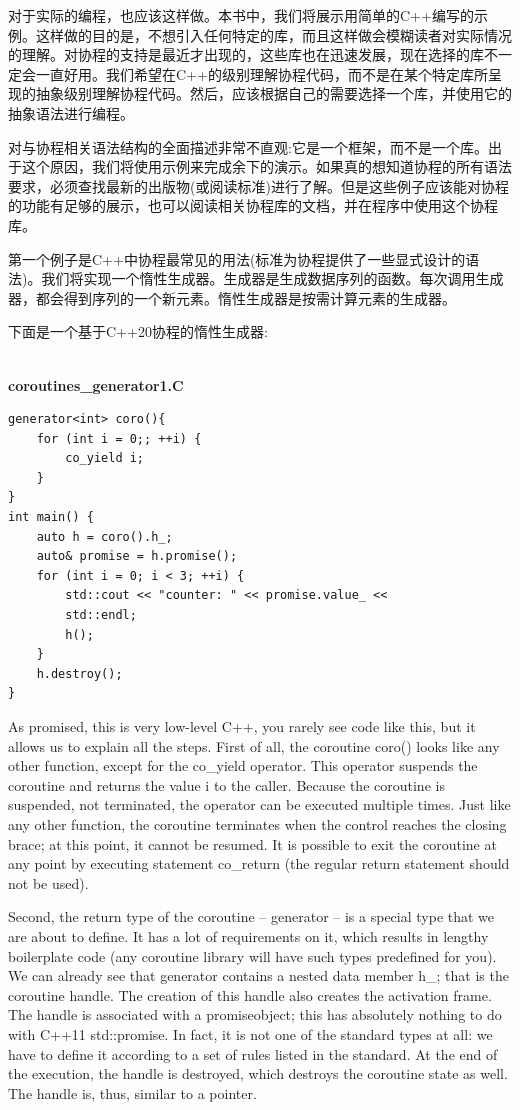 对于实际的编程，也应该这样做。本书中，我们将展示用简单的C++编写的示例。这样做的目的是，不想引入任何特定的库，而且这样做会模糊读者对实际情况的理解。对协程的支持是最近才出现的，这些库也在迅速发展，现在选择的库不一定会一直好用。我们希望在C++的级别理解协程代码，而不是在某个特定库所呈现的抽象级别理解协程代码。然后，应该根据自己的需要选择一个库，并使用它的抽象语法进行编程。

对与协程相关语法结构的全面描述非常不直观:它是一个框架，而不是一个库。出于这个原因，我们将使用示例来完成余下的演示。如果真的想知道协程的所有语法要求，必须查找最新的出版物(或阅读标准)进行了解。但是这些例子应该能对协程的功能有足够的展示，也可以阅读相关协程库的文档，并在程序中使用这个协程库。


第一个例子是C++中协程最常见的用法(标准为协程提供了一些显式设计的语法)。我们将实现一个惰性生成器。生成器是生成数据序列的函数。每次调用生成器，都会得到序列的一个新元素。惰性生成器是按需计算元素的生成器。

下面是一个基于C++20协程的惰性生成器:

\hspace*{\fill} \\ %
\noindent
\textbf{coroutines\_generator1.C}
\begin{lstlisting}[style=styleCXX]
generator<int> coro(){
	for (int i = 0;; ++i) {
		co_yield i;
	}
}
int main() {
	auto h = coro().h_;
	auto& promise = h.promise();
	for (int i = 0; i < 3; ++i) {
		std::cout << "counter: " << promise.value_ << 
		std::endl;
		h();
	}
	h.destroy();
}
\end{lstlisting}

As promised, this is very low-level C++, you rarely see code like this, but it allows us to explain all the steps. First of all, the coroutine coro() looks like any other function, except for the co\_yield operator. This operator suspends the coroutine and returns the value i to the caller. Because the coroutine is suspended, not terminated, the operator can be executed multiple times. Just like any other function, the coroutine terminates when the control reaches the closing brace; at this point, it cannot be resumed. It is possible to exit the coroutine at any point by executing statement co\_return (the regular return statement should not be used).

Second, the return type of the coroutine – generator – is a special type that we are about to define. It has a lot of requirements on it, which results in lengthy boilerplate code (any coroutine library will have such types predefined for you). We can already see that generator contains a nested data member h\_; that is the coroutine handle. The creation of this handle also creates the activation frame. The handle is associated with a promiseobject; this has absolutely nothing to do with C++11 std::promise. In fact, it is not one of the standard types at all: we have to define it according to a set of rules listed in the standard. At the end of the execution, the handle is destroyed, which destroys the coroutine state as well. The handle is, thus, similar to a pointer.

